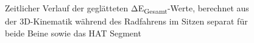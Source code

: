 \documentclass[
  letterpaper,
  DIV=11]{scrartcl}
\begin{document}
\begin{figure}


\caption{\label{fig-PInt_Kinematik_HAT_delta_E_gesamt_sitzen}Zeitlicher
Verlauf der geglätteten ΔE\textsubscript{Gesamt}-Werte, berechnet aus
der 3D-Kinematik während des Radfahrens im Sitzen separat für beide
Beine sowie das HAT Segment}

\end{figure}%
\end{document}
